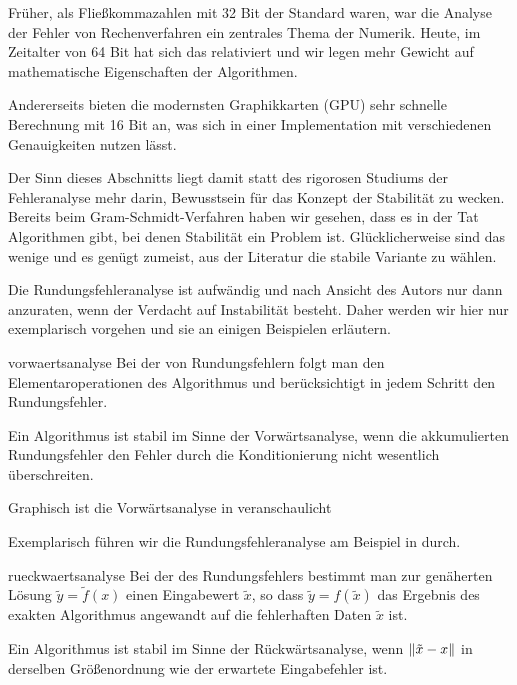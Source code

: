 \begin{remark}
  Früher, als Fließkommazahlen mit 32 Bit der Standard waren, war die
  Analyse der Fehler von Rechenverfahren ein zentrales Thema der
  Numerik. Heute, im Zeitalter von 64 Bit hat sich das relativiert und
  wir legen mehr Gewicht auf mathematische Eigenschaften der Algorithmen.

  Andererseits bieten die modernsten Graphikkarten (GPU) sehr schnelle
  Berechnung mit 16 Bit an, was sich in einer Implementation mit
  verschiedenen Genauigkeiten nutzen lässt.

  Der Sinn dieses Abschnitts liegt damit statt des rigorosen Studiums
  der Fehleranalyse mehr darin, Bewusstsein für das Konzept der
  Stabilität zu wecken. Bereits beim Gram-Schmidt-Verfahren haben wir
  gesehen, dass es in der Tat Algorithmen gibt, bei denen Stabilität
  ein Problem ist. Glücklicherweise sind das wenige und es genügt
  zumeist, aus der Literatur die stabile Variante zu wählen.

  Die Rundungsfehleranalyse ist aufwändig und nach Ansicht des Autors
  nur dann anzuraten, wenn der Verdacht auf Instabilität
  besteht. Daher werden wir hier nur exemplarisch vorgehen und sie an
  einigen Beispielen erläutern.
\end{remark}

\begin{Definition}{vorwaertsanalyse}
  Bei der  von Rundungsfehlern folgt man den
  Elementaroperationen des Algorithmus und berücksichtigt in jedem
  Schritt den Rundungsfehler.

  Ein Algorithmus ist stabil im Sinne der Vorwärtsanalyse, wenn die
  akkumulierten Rundungsfehler den Fehler durch die Konditionierung
  nicht wesentlich überschreiten.
\end{Definition}

\begin{remark}
  Graphisch ist die Vorwärtsanalyse in \cite[Abschnitt
  2.3.1]{DeuflhardHohmann08} veranschaulicht
\end{remark}

\begin{example}
  Exemplarisch führen wir die Rundungsfehleranalyse am Beispiel in
  \cite[Abschnitt 1.3.2]{Rannacher17} durch.
\end{example}

\begin{Definition}{rueckwaertsanalyse}
  Bei der  des Rundungsfehlers bestimmt man
  zur genäherten Lösung $\tilde y = \tilde f(x)$ einen Eingabewert
  $\tilde x$, so dass $\tilde y = f(\tilde x)$ das Ergebnis des
  exakten Algorithmus angewandt auf die fehlerhaften Daten $\tilde x$
  ist.

  Ein Algorithmus ist stabil im Sinne der Rückwärtsanalyse, wenn
  $\lVert\tilde x-x\rVert$ in derselben Größenordnung wie der erwartete
  Eingabefehler ist.
\end{Definition}

